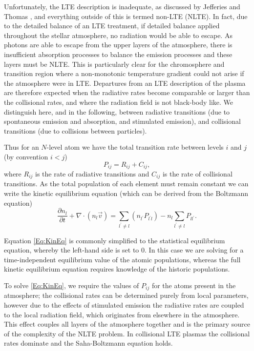 Unfortunately, the LTE description is inadequate, as discussed by Jefferies and Thomas \NeedRef{}, and everything outside of this is termed non-LTE (NLTE). In fact, due to the detailed balance of an LTE treatment, if detailed balance applied throughout the stellar atmosphere, no radiation would be able to escape. As photons are able to escape from the upper layers of the atmosphere, there is insufficient absorption processes to balance the emission processes and these layers must be NLTE. This is particularly clear for the chromosphere and transition region where a non-monotonic temperature gradient could not arise if the atmosphere were in LTE.
Departures from an LTE description of the plasma are therefore expected when the radiative rates become comparable or larger than the collisional rates, and where the radiation field is not black-body like.
We distinguish here, and in the following, between radiative transitions (due to spontaneous emission and absorption, and stimulated emission), and collisional transitions (due to collisions between particles).

Thus for an $N$-level atom we have the total transition rate between levels $i$ and $j$ (by convention $i < j$)
\begin{equation}
    P_{ij} = R_{ij} + C_{ij},
\end{equation}
where $R_{ij}$ is the rate of radiative transitions and $C_{ij}$ is the rate of collisional transitions.
As the total population of each element must remain constant we can write the kinetic equilibrium equation (which can be derived from the Boltzmann equation)
\begin{equation}
    \frac{\partial n_l}{\partial t} + \nabla \cdot (n_l \vec{v}) = \sum_{l^\prime\neq l} (n_{l^\prime} P_{l^\prime l}) - n_l \sum_{l^\prime\neq l} P_{ll^\prime}.
    \label{Eq:KinEq}
\end{equation}

Equation \eqref{Eq:KinEq} is commonly simplified to the statistical equilibrium equation, whereby the left-hand side is set to 0. In this case we are solving for a time-independent equilibrium value of the atomic populations, whereas the full kinetic equilibrium equation requires knowledge of the historic populations.

To solve \eqref{Eq:KinEq}, we require the values of $P_{ij}$ for the atoms present in the atmosphere; the collisional rates can be determined purely from local parameters, however due to the effects of stimulated emission the radiative rates are coupled to the local radiation field, which originates from elsewhere in the atmosphere. This effect couples all layers of the atmosphere together and is the primary source of the complexity of the NLTE problem. In collisional LTE plasmas the collisional rates dominate and the Saha-Boltzmann equation holds.

